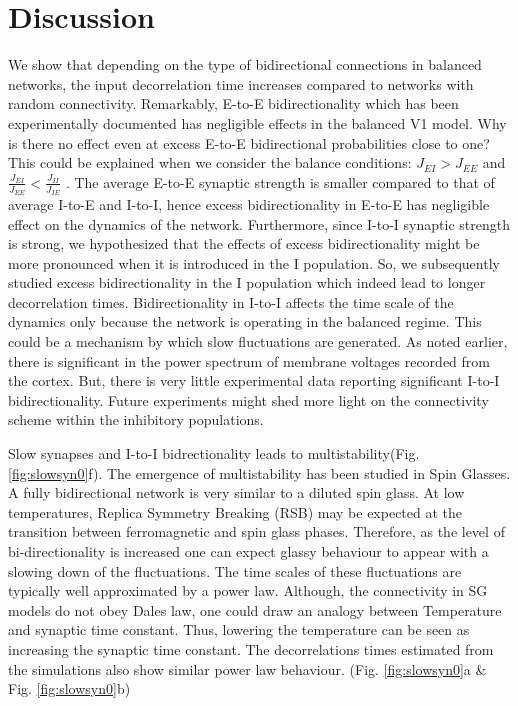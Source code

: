 \section{Discussion}
We show that depending on the type of bidirectional connections in balanced networks, the input decorrelation time increases compared to networks with random connectivity. Remarkably, E-to-E bidirectionality which has been experimentally documented has negligible effects in the balanced V1 model. 
Why is there no effect even at excess E-to-E bidirectional probabilities close to one?  This could be explained when we consider the balance conditions: $J_{EI} > J_{EE}$ and $\frac{J_{EI}}{J_{EE}} < \frac{J_{II}}{J_{IE}}$ \cite{carl1998}. The average E-to-E synaptic strength is smaller compared to that of average I-to-E and I-to-I, hence excess bidirectionality in E-to-E has negligible effect on the dynamics of the network. Furthermore, since I-to-I synaptic strength is strong, we hypothesized that the effects of excess bidirectionality might be more pronounced when it is introduced in the I population. So, we subsequently studied excess bidirectionality in the I population which indeed lead to longer decorrelation times. Bidirectionality in I-to-I affects the time scale of the dynamics only because the network is operating in the balanced regime. This could be a mechanism by which slow fluctuations are generated. As noted earlier, there is significant in the power spectrum of membrane voltages recorded from the cortex. But, there is very little experimental data reporting significant I-to-I bidirectionality. Future experiments might shed more light on the connectivity scheme within the inhibitory populations.

Slow synapses and I-to-I bidrectionality leads to multistability(Fig. \ref{fig:slowsyn0}f). The emergence of multistability has been studied in Spin Glasses. A fully bidirectional network is very similar to a diluted spin glass\cite{megard1987spin}. At low temperatures, Replica Symmetry Breaking (RSB) may be expected at the transition between ferromagnetic and spin glass phases. Therefore, as the level of bi-directionality is increased one can expect glassy behaviour to appear with a slowing down of the fluctuations\cite{Crisanti1987, Crisanti1988}. The time scales of these fluctuations are typically well approximated by a power law. Although, the connectivity in SG models do not obey Dales law, one could draw an analogy between Temperature and synaptic time constant. Thus, lowering the temperature can be seen as increasing the synaptic time constant. The decorrelations times estimated from the simulations also show similar power law behaviour. (Fig. \ref{fig:slowsyn0}a \& Fig. \ref{fig:slowsyn0}b) \\

